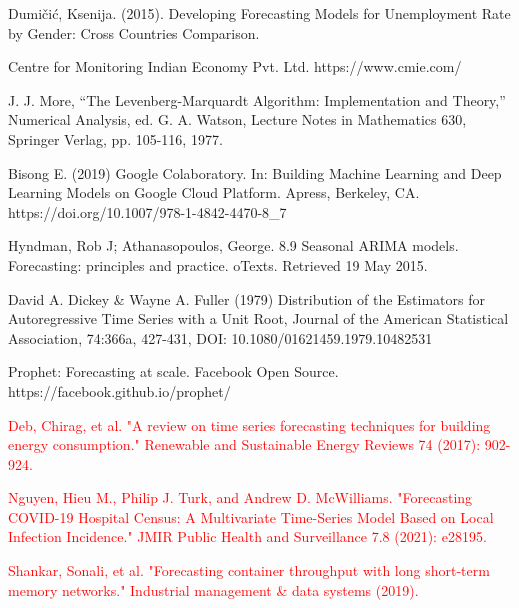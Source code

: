 \documentclass[times,twocolumn,final,authoryear]{elsarticle}
\begin{document}
\begin{thebibliography}{1}
		Dumičić, Ksenija. (2015). Developing Forecasting Models for Unemployment Rate by Gender: Cross Countries Comparison. 
		
		Centre for Monitoring Indian Economy Pvt. Ltd. https://www.cmie.com/
		
		J. J. More, “The Levenberg-Marquardt Algorithm: Implementation and Theory,” Numerical Analysis, ed. G. A. Watson, Lecture Notes in Mathematics 630, Springer Verlag, pp. 105-116, 1977.
		
		Bisong E. (2019) Google Colaboratory. In: Building Machine Learning and Deep Learning Models on Google Cloud Platform. Apress, Berkeley, CA. https://doi.org/10.1007/978-1-4842-4470-8\_7
		
		Hyndman, Rob J; Athanasopoulos, George. 8.9 Seasonal ARIMA models. Forecasting: principles and practice. oTexts. Retrieved 19 May 2015.
		
		David A. Dickey \& Wayne A. Fuller (1979) Distribution of the Estimators for Autoregressive Time Series with a Unit Root, Journal of the American Statistical Association, 74:366a, 427-431, DOI: 10.1080/01621459.1979.10482531
		
		Prophet: Forecasting at scale. Facebook Open Source. https://facebook.github.io/prophet/
		
		\textcolor{red}{Deb, Chirag, et al. "A review on time series forecasting techniques for building energy consumption." Renewable and Sustainable Energy Reviews 74 (2017): 902-924.}
		
		\textcolor{red}{Nguyen, Hieu M., Philip J. Turk, and Andrew D. McWilliams. "Forecasting COVID-19 Hospital Census: A Multivariate Time-Series Model Based on Local Infection Incidence." JMIR Public Health and Surveillance 7.8 (2021): e28195.}
		
		\textcolor{red}{Shankar, Sonali, et al. "Forecasting container throughput with long short-term memory networks." Industrial management \& data systems (2019).}
		
	\end{thebibliography}
	
	
\end{document}
